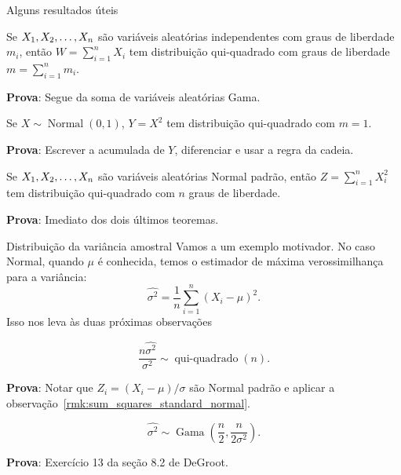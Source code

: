 \begin{frame}{Alguns resultados úteis}

\begin{theo}
Se $X_1, X_2, \ldots, X_n$ são variáveis aleatórias independentes com graus de liberdade $m_i$, então $W = \sum_{i=1}^n X_i$ tem distribuição qui-quadrado com graus de liberdade $m =  \sum_{i=1}^n m_i$.
\end{theo}
\textbf{Prova}: Segue da soma de variáveis aleatórias Gama.

\begin{theo}
Se $X \sim\operatorname{Normal}(0, 1)$, $Y = X^2$ tem distribuição qui-quadrado com $m=1$. 
\end{theo}
\textbf{Prova}: Escrever a acumulada de $Y$, diferenciar e usar a regra da cadeia.

\begin{obs}
\label{rmk:sum_squares_standard_normal}
 Se $X_1, X_2, \ldots, X_n$ são variáveis aleatórias Normal padrão, então $Z = \sum_{i=1}^n X_i^2$ tem distribuição qui-quadrado com $n$ graus de liberdade.
\end{obs}
\textbf{Prova}: Imediato dos dois últimos teoremas.

\end{frame}

\begin{frame}{Distribuição da variância amostral}
 Vamos a um exemplo motivador.
No caso Normal, quando $\mu$ é conhecida, temos o estimador de máxima verossimilhança para a variância:
\[ \hat{\sigma^2} = \frac{1}{n} \sum_{i=1}^n (X_i - \mu)^2. \]
Isso nos leva às duas próximas observações
\begin{obs}
 \begin{equation*}
  \frac{n\hat{\sigma^2}}{\sigma^2} \sim \operatorname{qui-quadrado}(n).
 \end{equation*}
\end{obs}
\textbf{Prova}: Notar que $Z_i = (X_i-\mu)/\sigma$ são Normal padrão e aplicar a observação~\ref{rmk:sum_squares_standard_normal}.

\begin{obs}
\label{rmk:sampling_distribution_normal_variance}
 \begin{equation*}
  \hat{\sigma^2} \sim \operatorname{Gama}\left(\frac{n}{2}, \frac{n}{2\sigma^2} \right).
 \end{equation*}

\end{obs}
\textbf{Prova}: Exercício 13 da seção 8.2 de DeGroot. 
\end{frame}

